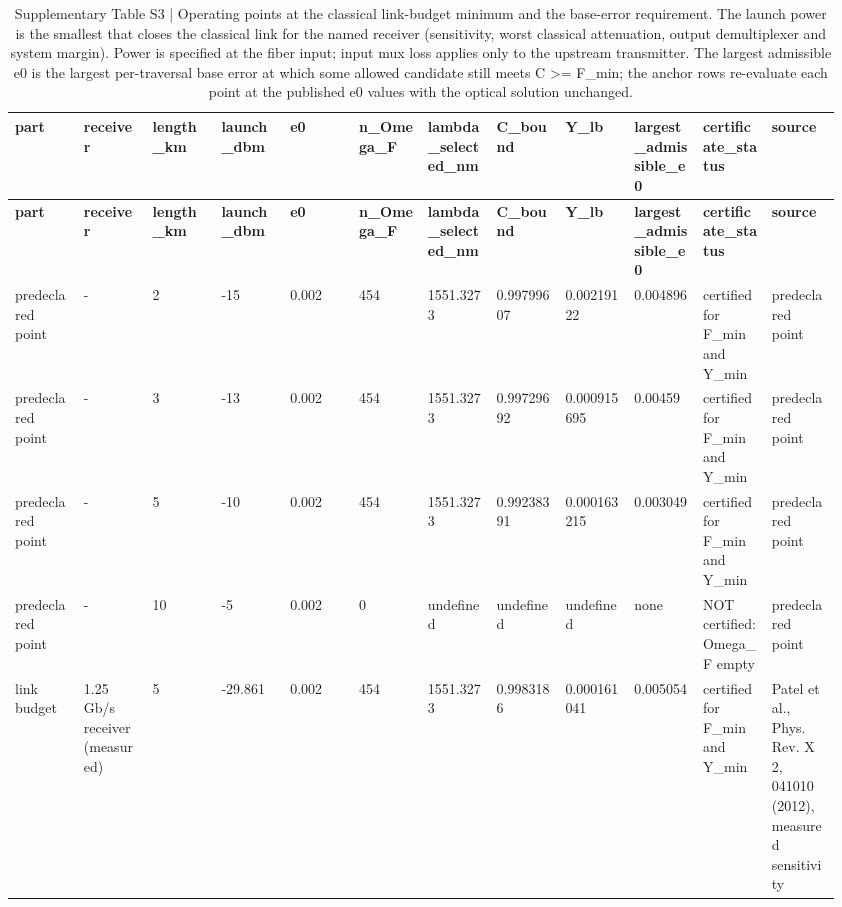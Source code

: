 \begin{longtable}{p{0.08\linewidth}p{0.08\linewidth}p{0.08\linewidth}p{0.08\linewidth}p{0.08\linewidth}p{0.08\linewidth}p{0.08\linewidth}p{0.08\linewidth}p{0.08\linewidth}p{0.08\linewidth}p{0.08\linewidth}p{0.08\linewidth}}
\caption{Supplementary Table S3 | Operating points at the classical link-budget minimum and the base-error requirement. The launch power is the smallest that closes the classical link for the named receiver (sensitivity, worst classical attenuation, output demultiplexer and system margin). Power is specified at the fiber input; input mux loss applies only to the upstream transmitter. The largest admissible e0 is the largest per-traversal base error at which some allowed candidate still meets C >= F\_min; the anchor rows re-evaluate each point at the published e0 values with the optical solution unchanged.}\label{tab:supp_table_s3_link_budget_and_base_error}\\
\hline
\textbf{part} & \textbf{receiver} & \textbf{length\_km} & \textbf{launch\_dbm} & \textbf{e0} & \textbf{n\_Omega\_F} & \textbf{lambda\_selected\_nm} & \textbf{C\_bound} & \textbf{Y\_lb} & \textbf{largest\_admissible\_e0} & \textbf{certificate\_status} & \textbf{source} \\
\hline
\endfirsthead
\hline
\textbf{part} & \textbf{receiver} & \textbf{length\_km} & \textbf{launch\_dbm} & \textbf{e0} & \textbf{n\_Omega\_F} & \textbf{lambda\_selected\_nm} & \textbf{C\_bound} & \textbf{Y\_lb} & \textbf{largest\_admissible\_e0} & \textbf{certificate\_status} & \textbf{source} \\
\hline
\endhead
predeclared point & - & 2 & -15 & 0.002 & 454 & 1551.3273 & 0.99799607 & 0.00219122 & 0.004896 & certified for F\_min and Y\_min & predeclared point \\
predeclared point & - & 3 & -13 & 0.002 & 454 & 1551.3273 & 0.99729692 & 0.000915695 & 0.00459 & certified for F\_min and Y\_min & predeclared point \\
predeclared point & - & 5 & -10 & 0.002 & 454 & 1551.3273 & 0.99238391 & 0.000163215 & 0.003049 & certified for F\_min and Y\_min & predeclared point \\
predeclared point & - & 10 & -5 & 0.002 & 0 & undefined & undefined & undefined & none & NOT certified: Omega\_F empty & predeclared point \\
link budget & 1.25 Gb/s receiver (measured) & 5 & -29.861 & 0.002 & 454 & 1551.3273 & 0.9983186 & 0.000161041 & 0.005054 & certified for F\_min and Y\_min & Patel et al., Phys. Rev. X 2, 041010 (2012), measured sensitivity \\

\end{longtable}
